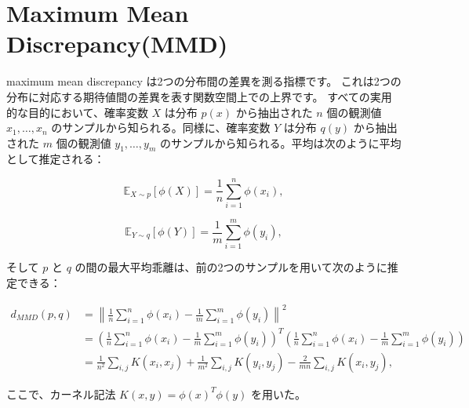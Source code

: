\documentclass[dvipdfmx,a4paper]{jsarticle}%
\begin{document}
\section{\textbf{Maximum Mean Discrepancy(MMD)}}
\begin{dfn}\label{def:mmd}
  maximum mean discrepancy は2つの分布間の差異を測る指標です。 これは2つの分布に対応する期待値間の差異を表す関数空間上での上界です。
すべての実用的な目的において、確率変数 $X$ は分布 $p(x)$ から抽出された $n$ 個の観測値 $x_1, \ldots, x_n$ のサンプルから知られる。同様に、確率変数 $Y$ は分布 $q(y)$ から抽出された $m$ 個の観測値 $y_1, \ldots, y_m$ のサンプルから知られる。平均は次のように平均として推定される：

$$\mathbb{E}_{X \sim p}[\phi(X)] = \frac{1}{n} \sum_{i=1}^n \phi(x_i),$$

$$\mathbb{E}_{Y \sim q}[\phi(Y)] = \frac{1}{m} \sum_{i=1}^m \phi(y_i),$$

そして $p$ と $q$ の間の最大平均乖離は、前の2つのサンプルを用いて次のように推定できる：

\begin{align*}
d_{MMD}(p, q) &= \left\|\frac{1}{n} \sum_{i=1}^n \phi(x_i) - \frac{1}{m} \sum_{i=1}^m \phi(y_i)\right\|^2 \\
&= \left(\frac{1}{n} \sum_{i=1}^n \phi(x_i) - \frac{1}{m} \sum_{i=1}^m \phi(y_i)\right)^T \left(\frac{1}{n} \sum_{i=1}^n \phi(x_i) - \frac{1}{m} \sum_{i=1}^m \phi(y_i)\right) \\
&= \frac{1}{n^2} \sum_{i,j} K(x_i, x_j) + \frac{1}{m^2} \sum_{i,j} K(y_i, y_j) - \frac{2}{mn} \sum_{i,j} K(x_i, y_j), 
\end{align*}

ここで、カーネル記法 $K(x, y) = \phi(x)^T \phi(y)$ を用いた。
\end{dfn}
\appendix

\end{document}
